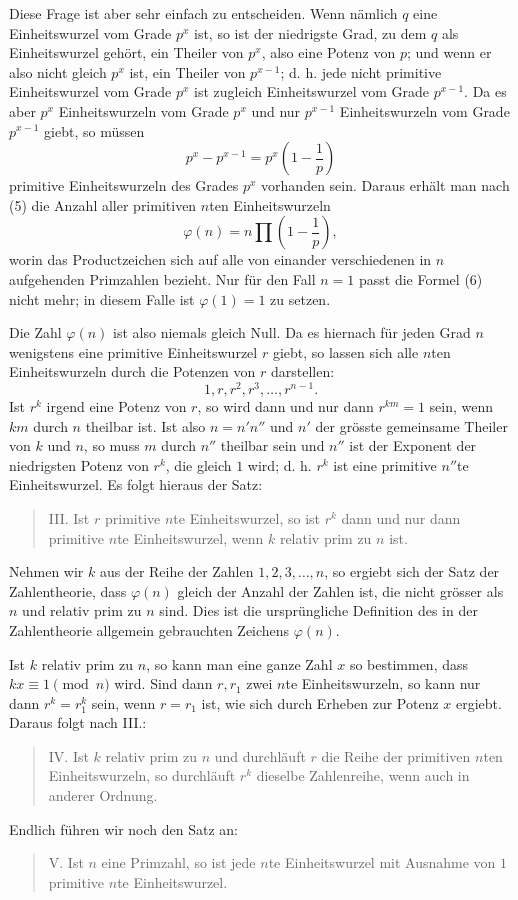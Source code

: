 \documentclass[11pt]{article}
\begin{document}
Diese Frage ist aber sehr einfach zu entscheiden. Wenn nämlich $q$ eine Einheitswurzel vom Grade $p^x$ ist, so ist der niedrigste Grad, zu dem $q$ als Einheitswurzel gehört, ein Theiler von $p^x$, also eine Potenz von $p$; und wenn er also nicht gleich $p^x$ ist, ein Theiler von $p^{x-1}$; d. h. jede nicht primitive Einheitswurzel vom Grade $p^x$ ist zugleich Einheitswurzel vom Grade $p^{x-1}$. Da es aber $p^x$ Einheitswurzeln vom Grade $p^x$ und nur $p^{x-1}$ Einheitswurzeln vom Grade $p^{x-1}$ giebt, so müssen
\[
        p^x-p^{x-1}=p^x\left(1-\frac1p\right)
\]
primitive Einheitswurzeln des Grades $p^x$ vorhanden sein. Daraus erhält man nach (5) die Anzahl aller primitiven $n$ten Einheitswurzeln
\[
\tag{6}        \varphi(n)=n\prod\left(1-\frac1p\right),
\]
worin das Productzeichen sich auf alle von einander verschiedenen in $n$ aufgehenden Primzahlen bezieht. Nur für den Fall $n=1$ passt die Formel (6) nicht mehr; in diesem Falle ist $\varphi(1)=1$ zu setzen.

Die Zahl $\varphi(n)$ ist also niemals gleich Null. Da es hiernach für jeden Grad $n$ wenigstens eine primitive Einheitswurzel $r$ giebt, so lassen sich alle $n$ten Einheitswurzeln durch die Potenzen von $r$ darstellen:
\[
\tag{7}        1,r,r^2,r^3,\ldots,r^{n-1}.
\]
Ist $r^k$ irgend eine Potenz von $r$, so wird dann und nur dann $r^{km}=1$ sein, wenn $km$ durch $n$ theilbar ist. Ist also $n=n'n''$ und $n'$ der grösste gemeinsame Theiler von $k$ und $n$, so muss $m$ durch $n''$ theilbar sein und $n''$ ist der Exponent der niedrigsten Potenz von $r^k$, die gleich $1$ wird; d. h. $r^k$ ist eine primitive $n''$te Einheitswurzel. Es folgt hieraus der Satz:
\begin{quote}
III. Ist $r$ primitive $n$te Einheitswurzel, so ist $r^k$ dann und nur dann primitive $n$te Einheitswurzel, wenn $k$ relativ prim zu $n$ ist.
\end{quote}
Nehmen wir $k$ aus der Reihe der Zahlen $1,2,3,\ldots,n$, so ergiebt sich der Satz der Zahlentheorie, dass $\varphi(n)$ gleich der Anzahl der Zahlen ist, die nicht grösser als $n$ und relativ prim zu $n$ sind. Dies ist die ursprüngliche Definition des in der Zahlentheorie allgemein gebrauchten Zeichens $\varphi(n)$.

Ist $k$ relativ prim zu $n$, so kann man eine ganze Zahl $x$ so bestimmen, dass $kx\equiv1\pmod n$ wird. Sind dann $r,r_1$ zwei $n$te Einheitswurzeln, so kann nur dann $r^k=r_1^k$ sein, wenn $r=r_1$ ist, wie sich durch Erheben zur Potenz $x$ ergiebt. Daraus folgt nach III.:
\begin{quote}
IV. Ist $k$ relativ prim zu $n$ und durchläuft $r$ die Reihe der primitiven $n$ten Einheitswurzeln, so durchläuft $r^k$ dieselbe Zahlenreihe, wenn auch in anderer Ordnung.
\end{quote}
Endlich führen wir noch den Satz an:
\begin{quote}
V. Ist $n$ eine Primzahl, so ist jede $n$te Einheitswurzel mit Ausnahme von $1$ primitive $n$te Einheitswurzel.
\end{quote}
\end{document}
